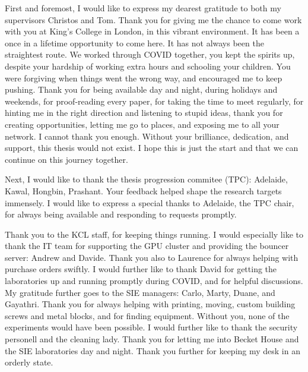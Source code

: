 First and foremost, I would like to express my dearest gratitude to both my supervisors Christos and Tom. Thank you for giving me the chance to come work with you at King's College in London, in this vibrant environment. It has been a once in a lifetime opportunity to come here. It has not always been the straightest route. We worked through COVID together, you kept the spirits up, despite your hardship of working extra hours and schooling your children. You were forgiving when things went the wrong way, and encouraged me to keep pushing. Thank you for being available day and night, during holidays and weekends, for proof-reading every paper, for taking the time to meet regularly, for hinting me in the right direction and listening to stupid ideas, thank you for creating opportunities, letting me go to places, and exposing me to all your network. I cannot thank you enough. Without your brilliance, dedication, and support, this thesis would not exist. I hope this is just the start and that we can continue on this journey together.

Next, I would like to thank the thesis progression commitee (TPC): Adelaide, Kawal, Hongbin, Prashant.  Your feedback helped shape the research targets immensely. I would like to express a special thanks to Adelaide, the TPC chair, for always being available and responding to requests promptly.




Thank you to the KCL staff, for keeping things running. I would especially like to thank the IT team for supporting the GPU cluster and providing the bouncer server: Andrew and Davide. Thank you also to Laurence for always helping with purchase orders swiftly. I would further like to thank David for getting the laboratories up and running promptly during COVID, and for helpful discussions. My gratitude further goes to the SIE managers: Carlo, Marty, Duane, and Gayathri. Thank you for always helping with printing, moving, custom building screws and metal blocks, and for finding equipment. Without you, none of the experiments would have been possible. I would further like to thank the security personell and the cleaning lady. Thank you for letting me into Becket House and the SIE laboratories day and night. Thank you further for keeping my desk in an orderly state.

